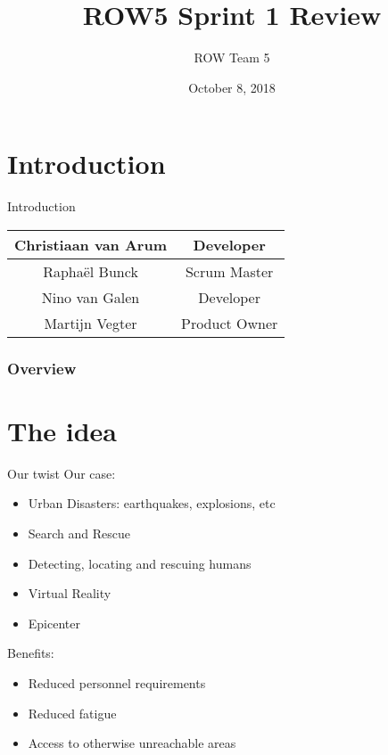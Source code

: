 \documentclass{beamer}
\title[Sprint Review]{ROW5 Sprint 1 Review}
\author{ROW Team 5} %
\institute[HvA]
{
	Amsterdam University of Applied Sciences \\
	\medskip
	\textit{https://rescueonwheels.github.io/}
}
\date{October 8, 2018}
\begin{document}
\begin{frame}
\titlepage %
\end{frame}

\section{Introduction}
\begin{frame}{Introduction}
    \begin{center}
        \begin{tabular}{c|c}
             Christiaan van Arum    & Developer \\
             \hline
             Rapha\"{e}l Bunck & Scrum Master \\
             \hline
             Nino van Galen & Developer \\
             \hline
             Martijn Vegter & Product Owner
         \end{tabular}
    \end{center}
\end{frame}

\begin{frame}
\frametitle{Overview} %
\tableofcontents %
\end{frame}

\section{The idea}
\begin{frame}{Our twist}
    Our case:
    \begin{itemize}
        \item Urban Disasters: earthquakes, explosions, etc
        \item Search and Rescue
        \item Detecting, locating and rescuing humans
        \item Virtual Reality 
        \item Epicenter
    \end{itemize}
    Benefits:
    \begin{itemize}
        \item Reduced personnel requirements
        \item Reduced fatigue
        \item Access to otherwise unreachable areas
    \end{itemize}
\end{frame}
\end{document}
